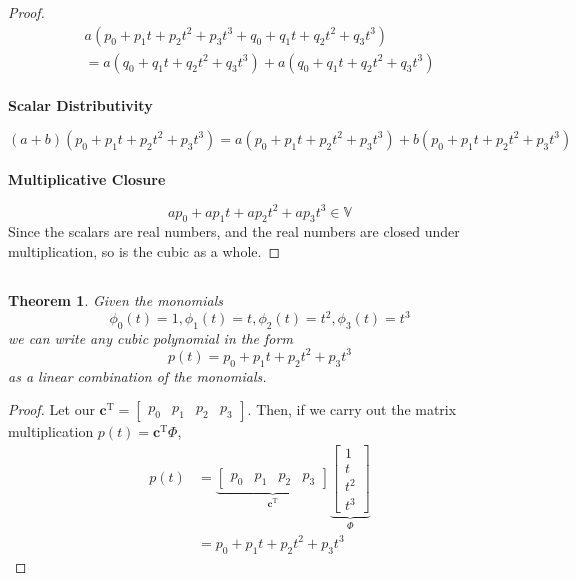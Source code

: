 \documentclass[]{article}
\numberwithin{equation}{section}
\newtheorem{genthm}{Theorem}
\begin{document}
\begin{proof}
\begin{align}
	a(p_0 + p_1 t + p_2 t^2 + p_3 t^3 + q_0 + q_1 t + q_2 t^2 + q_3 t^3) \\
	= a(q_0 + q_1 t + q_2 t^2 + q_3 t^3) + a(q_0 + q_1 t + q_2 t^2 + q_3 t^3)
\end{align}
\\
\textbf{Scalar Distributivity}

\begin{equation}
	(a + b) (p_0 + p_1 t + p_2 t^2 + p_3 t^3) = a (p_0 + p_1 t + p_2 t^2 + p_3 t^3) + b (p_0 + p_1 t + p_2 t^2 + p_3 t^3)
\end{equation}
\\
\textbf{Multiplicative Closure}

\begin{equation}
	a p_0 + a p_1 t + a p_2 t^2 + a p_3 t^3 \in \mathbb{V}
\end{equation}
Since the scalars are real numbers, and the real numbers are closed under multiplication, so is the cubic as a whole. 
\end{proof}

\subsection{}

\begin{genthm}
Given the monomials 
\begin{equation}
	\phi_0(t) = 1, \phi_1(t) = t, \phi_2(t) = t^2, \phi_3(t) = t^3
\end{equation}
we can write any cubic polynomial in the form 
\begin{equation}
p(t) = p_0 + p_1 t + p_2 t^2 + p_3 t^3
\end{equation}
as a linear combination of the monomials. 
\end{genthm}

\begin{proof}
Let our \(\mathbf{c}^{\text{T}} = \begin{bmatrix}
p_0 & p_1 & p_2 & p_3
\end{bmatrix}\). Then, if we carry out the matrix multiplication \(p(t) = \mathbf{c}^{\text{T}} \Phi\), 
\begin{align}
	p(t) &= \underbrace{\begin{bmatrix}
	p_0 & p_1 & p_2 & p_3
	\end{bmatrix}}_{\mathbf{c}^{\text{T}}}
	\underbrace{\begin{bmatrix}
	1 \\
	t \\
	t^2 \\
	t^3
	\end{bmatrix}}_{\Phi} \\
	&= p_0 + p_1 t + p_2 t^2 + p_3 t^3
\end{align}
\end{proof}
\end{document}
